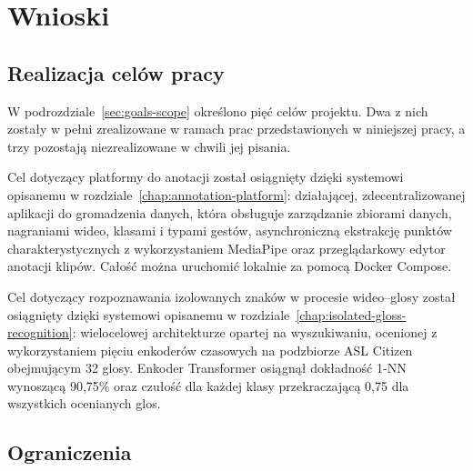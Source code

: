 
\section{Wnioski}
\label{chap:conclusions}

\subsection{Realizacja celów pracy}
\label{sec:conclusions-goals}

W podrozdziale~\ref{sec:goals-scope} określono pięć celów projektu. Dwa z nich
zostały w pełni zrealizowane w ramach prac przedstawionych w niniejszej pracy,
a trzy pozostają niezrealizowane w chwili jej pisania.

Cel dotyczący platformy do anotacji został osiągnięty dzięki systemowi opisanemu
w rozdziale~\ref{chap:annotation-platform}: działającej, zdecentralizowanej
aplikacji do gromadzenia danych, która obsługuje zarządzanie zbiorami danych,
nagraniami wideo, klasami i typami gestów, asynchroniczną ekstrakcję punktów
charakterystycznych z wykorzystaniem MediaPipe oraz przeglądarkowy edytor
anotacji klipów. Całość można uruchomić lokalnie za pomocą Docker Compose.

Cel dotyczący rozpoznawania izolowanych znaków w procesie wideo--glosy został
osiągnięty dzięki systemowi opisanemu
w rozdziale~\ref{chap:isolated-gloss-recognition}: wielocelowej architekturze
opartej na wyszukiwaniu, ocenionej z wykorzystaniem pięciu enkoderów czasowych
na podzbiorze ASL Citizen obejmującym 32 glosy. Enkoder Transformer osiągnął
dokładność 1-NN wynoszącą 90,75\% oraz czułość dla każdej klasy przekraczającą
0,75 dla wszystkich ocenianych glos.


\subsection{Ograniczenia}
\label{sec:conclusions-limitations}

